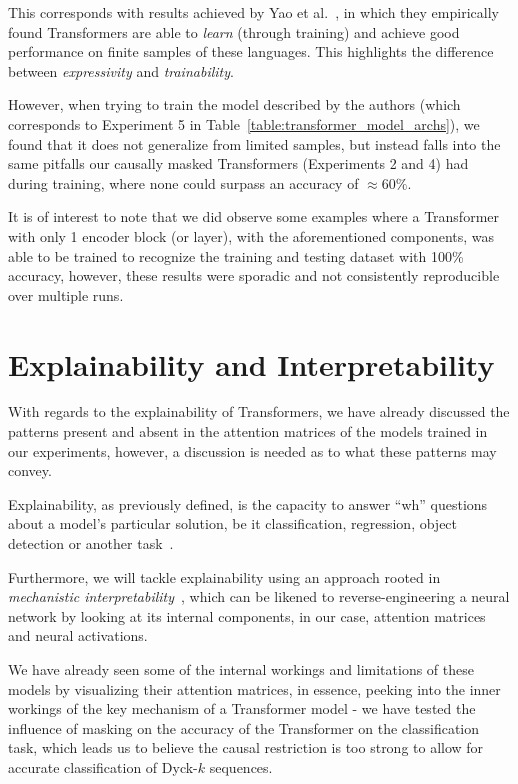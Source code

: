 This corresponds with results achieved by Yao et al.~\cite{bounded-hierarchical-languages}, in which they empirically found Transformers are able to \emph{learn} (through training) and achieve good performance on finite samples of these languages. This highlights the difference between \emph{expressivity} and \emph{trainability}. 

However, when trying to train the model described by the authors (which corresponds to Experiment 5 in Table~\ref{table:transformer_model_archs}), we found that it does not generalize from limited samples, but instead falls into the same pitfalls our causally masked Transformers (Experiments 2 and 4) had during training, where none could surpass an accuracy of $\approx 60\%$.

It is of interest to note that we did observe some examples where a Transformer with only 1 encoder block (or layer), with the aforementioned components, was able to be trained to recognize the training and testing dataset with 100\% accuracy, however, these results were sporadic and not consistently reproducible over multiple runs.

\section{Explainability and Interpretability}

With regards to the explainability of Transformers, we have already discussed the patterns present and absent in the attention matrices of the models trained in our experiments, however, a discussion is needed as to what these patterns may convey.

Explainability, as previously defined, is the capacity to answer ``wh'' questions about a model's particular solution, be it classification, regression, object detection or another task~\cite{explainable-ai}.

Furthermore, we will tackle explainability using an approach rooted in \emph{mechanistic interpretability}~\cite{mech_interp, mech-interp-ai-safety}, which can be likened to reverse-engineering a neural network by looking at its internal components, in our case, attention matrices and neural activations.

We have already seen some of the internal workings and limitations of these models by visualizing their attention matrices, in essence, peeking into the inner workings of the key mechanism of a Transformer model - we have tested the influence of masking on the accuracy of the Transformer on the classification task, which leads us to believe the causal restriction is too strong to allow for accurate classification of Dyck-$k$ sequences. 

